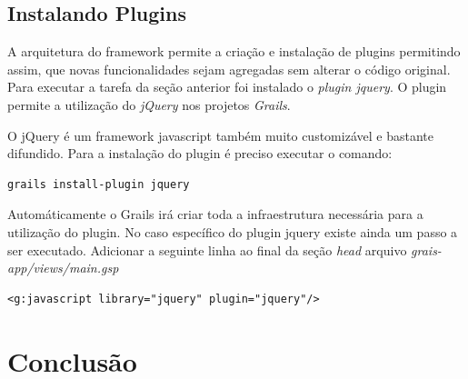\documentclass[12pt]{article}
\begin{document}
\subsection{Instalando Plugins}

    A arquitetura do framework permite a criação e instalação de plugins permitindo assim,
    que novas funcionalidades sejam agregadas sem alterar o código original. Para executar
    a tarefa da seção anterior foi instalado o \emph{plugin jquery}. O plugin permite a 
    utilização do \emph{jQuery} nos projetos \emph{Grails}.
    
    O jQuery é um framework javascript também muito customizável e bastante difundido.
    Para a instalação do plugin é preciso executar o comando:
    
    \begin{lstlisting}[basicstyle={\small \ttfamily}]
           grails install-plugin jquery
    \end{lstlisting}
    
    Automáticamente o Grails irá criar toda a infraestrutura necessária para a utilização
    do plugin. No caso específico do plugin jquery existe ainda um passo a ser executado.
    Adicionar a seguinte linha ao final da seção \emph{head} arquivo \emph{grais-app/views/main.gsp}
    
    \begin{lstlisting}[style=Java]
            <g:javascript library="jquery" plugin="jquery"/>
    \end{lstlisting}


    
\section{Conclusão}
\end{document}
